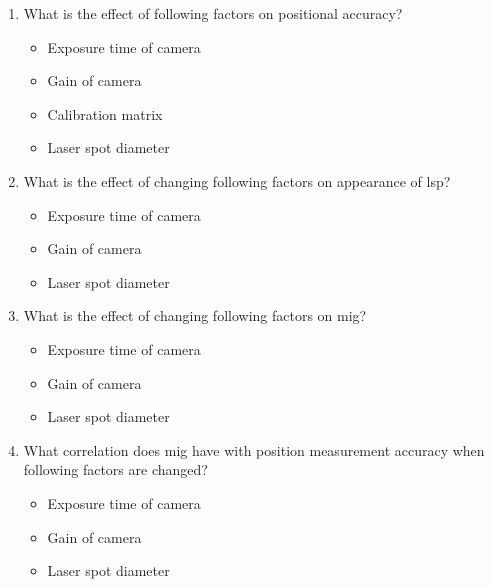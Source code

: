 \begin{enumerate}
    \item What is the effect of following factors on positional accuracy?
        \begin{itemize}
            \item Exposure time of camera
            \item Gain of camera
            \item Calibration matrix
            \item Laser spot diameter
        \end{itemize}
    \item What is the effect of changing following factors on appearance of \gls{lsp}?
        \begin{itemize}
            \item Exposure time of camera
            \item Gain of camera
            \item Laser spot diameter
        \end{itemize}
    \item What is the effect of changing following factors on \gls{mig}?
        \begin{itemize}
            \item Exposure time of camera
            \item Gain of camera
            \item Laser spot diameter
        \end{itemize}
    \item What correlation does \gls{mig} have with position measurement accuracy when following factors are changed?
        \begin{itemize}
            \item Exposure time of camera
            \item Gain of camera
            \item Laser spot diameter
        \end{itemize} 
\end{enumerate}

